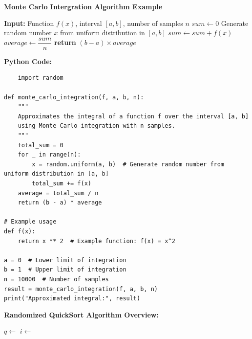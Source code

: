 \documentclass[12pt]{book} %
\begin{document}
\textbf{Monte Carlo Intergration Algorithm Example}
\FloatBarrier
\begin{algorithm}[H]
\caption{Monte Carlo Integration}
\begin{algorithmic}[1]
\State \textbf{Input:} Function $f(x)$, interval $[a, b]$, number of samples $n$
\State $sum \gets 0$
    \State Generate random number $x$ from uniform distribution in $[a, b]$
    \State $sum \gets sum + f(x)$
\EndFor
\State $average \gets \dfrac{sum}{n}$
\State \textbf{return} $(b-a) \times average$
\end{algorithmic}
\end{algorithm}
\FloatBarrier
\textbf{Python Code:}
\FloatBarrier
\begin{lstlisting}
    import random

def monte_carlo_integration(f, a, b, n):
    """
    Approximates the integral of a function f over the interval [a, b]
    using Monte Carlo integration with n samples.
    """
    total_sum = 0
    for _ in range(n):
        x = random.uniform(a, b)  # Generate random number from uniform distribution in [a, b]
        total_sum += f(x)
    average = total_sum / n
    return (b - a) * average

# Example usage
def f(x):
    return x ** 2  # Example function: f(x) = x^2

a = 0  # Lower limit of integration
b = 1  # Upper limit of integration
n = 10000  # Number of samples
result = monte_carlo_integration(f, a, b, n)
print("Approximated integral:", result)
\end{lstlisting}
\FloatBarrier
\textbf{Randomized QuickSort Algorithm Overview:}
\FloatBarrier
\begin{algorithm}[H]
\caption{Randomized QuickSort}
\begin{algorithmic}[1]
        \State $q \gets $ 
        \State {}
        \State {}
    \EndIf
\EndFunction
{}
    \State $i \gets$  
    \State {} 
    \State \Return {}
\EndFunction
\end{algorithmic}
\end{algorithm}
\end{document}
